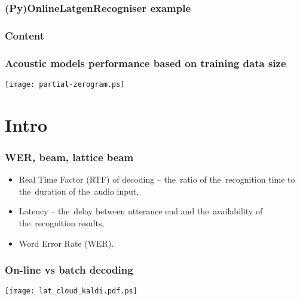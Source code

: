 

\maketitle


\begin{frame}\frametitle{(Py)OnlineLatgenRecogniser example} 
    
\end{frame}


\begin{frame} \frametitle{Content} \tableofcontents \end{frame}

\begin{frame}\frametitle{Acoustic models performance based on training data size} 
    \texttt{[image: partial-zerogram.ps]}
\end{frame}

\section{Intro} 

\begin{frame}\frametitle{WER, beam, lattice beam} 
    \begin{itemize}
        \item Real Time Factor (RTF) of decoding -- the~ratio of the~recognition time to the~duration of the~audio input,
        \item Latency -- the~delay between utterance end and the~availability of the~recognition results,
        \item Word Error Rate (WER).
    \end{itemize}
\end{frame}

\begin{frame}\frametitle{On-line vs batch decoding} 
    \texttt{[image: lat\_cloud\_kaldi.pdf.ps]}
\end{frame}


